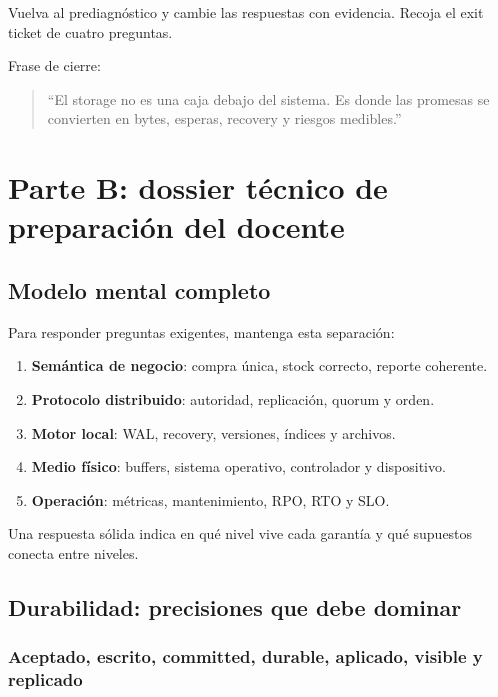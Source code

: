 \documentclass[variant=docente,cover=institutional,mode=screen]{ua-engineering-v6-article}
\begin{document}
Vuelva al prediagnóstico y cambie las respuestas con evidencia. Recoja el exit ticket de cuatro preguntas.

Frase de cierre:

\begin{quote}
``El storage no es una caja debajo del sistema. Es donde las promesas se convierten en bytes, esperas, recovery y riesgos medibles.''
\end{quote}

\section{Parte B: dossier técnico de preparación del docente}

\subsection{Modelo mental completo}

Para responder preguntas exigentes, mantenga esta separación:

\begin{enumerate}
\item \textbf{Semántica de negocio}: compra única, stock correcto, reporte coherente.
\item \textbf{Protocolo distribuido}: autoridad, replicación, quorum y orden.
\item \textbf{Motor local}: WAL, recovery, versiones, índices y archivos.
\item \textbf{Medio físico}: buffers, sistema operativo, controlador y dispositivo.
\item \textbf{Operación}: métricas, mantenimiento, RPO, RTO y SLO.
\end{enumerate}

Una respuesta sólida indica en qué nivel vive cada garantía y qué supuestos conecta entre niveles.

\subsection{Durabilidad: precisiones que debe dominar}

\subsubsection*{Aceptado, escrito, committed, durable, aplicado, visible y replicado}
\end{document}
